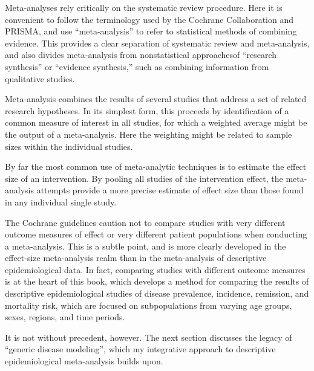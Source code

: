 Meta-analyses rely critically on the systematic review procedure. Here
it is convenient to follow the terminology used by the Cochrane
Collaboration and PRISMA, and use ``meta-analysis'' to refer to
statistical methods of combining evidence.  This provides a clear
separation of systematic review and meta-analysis, and also divides
meta-analysis from nonstatistical approachesof ``research
synthesis'' or ``evidence synthesis,'' such as combining information
from qualitative studies.

Meta-analysis combines the results of several studies that address a
set of related research hypotheses. In its simplest form, this
proceeds by identification of a common measure of interest in all studies, for
which a weighted average might be the output of a meta-analysis. Here
the weighting might be related to sample sizes within the individual
studies.

By far the most common use of meta-analytic techniques is to estimate
the effect size of an intervention.  By pooling all studies of the
intervention effect, the meta-analysis attempts provide a more precise
estimate of effect size than those found in any individual single
study.

The Cochrane guidelines caution not to compare studies with very
different outcome measures of effect or very different patient
populations when conducting a
meta-analysis.\cite{Cochrane_Cochrane_2012} This is a subtle point,
and is more clearly developed in the effect-size meta-analysis realm
than in the meta-analysis of descriptive epidemiological data.  In
fact, comparing studies with different outcome measures is at the
heart of this book, which develops a method for comparing the results
of descriptive epidemiological studies of disease prevalence,
incidence, remission, and mortality risk, which are focused on
subpopulations from varying age groups, sexes, regions, and time
periods.

It is not without precedent, however.  The next section discusses the
legacy of ``generic disease modeling'', which my integrative approach
to descriptive epidemiological meta-analysis builds upon.



